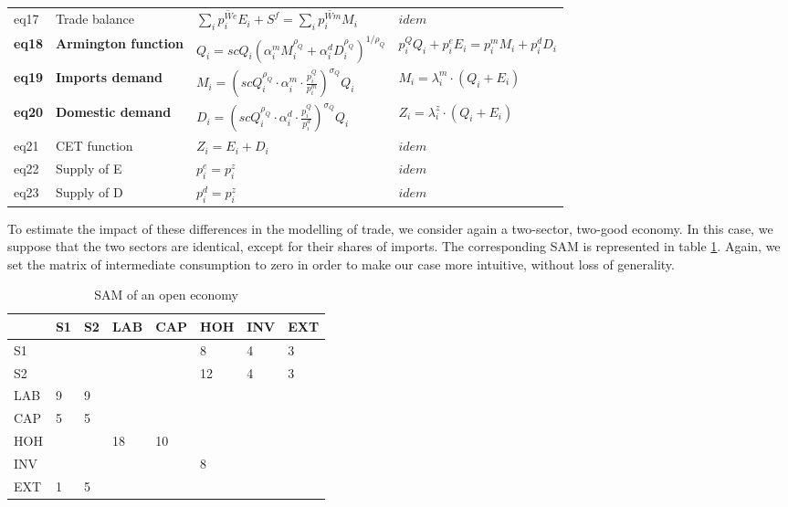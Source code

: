 \begin{table}[!h]
\begin{tabular}{llll}
		eq17 & Trade balance & $\sum_i \overline{p^{We}_i} E_i + S^f = \sum_i \overline{p^{Wm}_i} M_i$ & $idem$ \\
		\textbf{eq18} & \textbf{Armington function} & $Q_i = scQ_i (\alpha^m_i M_i^{\rho_Q} + \alpha^d_i D_i^{\rho_Q}  )^{1/\rho_Q} $ &  $p_i^Q Q_i + p_i^e E_i = p^m_i M_i + p^d_i D_i$ \\
		\textbf{eq19} & \textbf{Imports demand} & $M_i = \left( scQ_i^{\rho_Q} \cdot \alpha_i^m \cdot \frac{p_i^Q}{p_i^m} \right)^{\sigma_Q} Q_i$ & $M_i=\lambda^m_i \cdot (Q_i+E_i)$\\
		\textbf{eq20}  & \textbf{Domestic demand} & $D_i = \left( scQ_i^{\rho_Q} \cdot \alpha_i^d \cdot \frac{p_i^Q}{p_i^d} \right)^{\sigma_Q} Q_i$ & $Z_i=\lambda^z_i \cdot (Q_i+E_i)$\\
		eq21 & CET function & $Z_i = E_i + D_i$ & $idem$ \\
		eq22 & Supply of E & $p_i^e = p_i^z $ & $idem$ \\
		eq23 & Supply of D & $p_i^d = p_i^z  $ & $idem$ \\
		\bottomrule
	\end{tabular}
\end{table}

To estimate the impact of these differences in the modelling of trade, we consider again a two-sector, two-good economy. In this case, we suppose that the two sectors are identical, except for their shares of imports. The corresponding SAM is represented in table \ref{tab:openEconomy}.
Again, we set the matrix of intermediate consumption to zero in order to make our case more intuitive, without loss of generality.

\begin{table}[!h]
	\centering
	\caption{SAM of an open economy}
	\label{tab:openEconomy}
	\begin{tabular}{llllllll}
		\toprule
		& S1 & S2 & LAB & CAP & HOH & INV & EXT \\
		\midrule
		S1 &  &  &  &  & 8 & 4 & 3 \\
		S2 &  &  &  &  & 12 & 4 & 3 \\
		LAB & 9 & 9 &  &  &  &  &  \\
		CAP & 5 & 5 &  &  &  &  &  \\
		HOH &  &  & 18 & 10 &  &  &  \\
		INV &  &  &  &  & 8 &  &  \\
		EXT & 1 & 5 &  &  &  &  &  \\
		\bottomrule
	\end{tabular}
\end{table}

